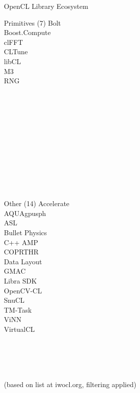 \begin{frame}{OpenCL Library Ecosystem}
\begin{minipage}{0.24\textwidth}
 \begin{block}{Primitives (7)}
Bolt\\
Boost.Compute\\
clFFT\\
CLTune\\
libCL\\
M3\\
RNG\\
 \\
 \\
 \\
 \\
 \\
 \\
 \\
 \\
 \\
 \\
 \\
 \end{block}
  \end{minipage}
 \begin{minipage}{0.24\textwidth}
 \begin{block}{Other (14)}
Accelerate\\
AQUAgpusph\\
ASL\\
Bullet Physics\\
C++ AMP\\
COPRTHR\\
Data Layout\\
GMAC\\
Libra SDK\\
OpenCV-CL\\
SnuCL\\
TM-Task\\
ViNN\\
VirtualCL\\
 \\
 \\
 \\
 \\
 \end{block}
 \end{minipage}
 
 \begin{center}
 \vspace*{-.5cm} \scriptsize (based on list at iwocl.org, filtering applied)
 \end{center}

\end{frame}



